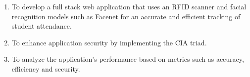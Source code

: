 \begin{comment}
How to formulate your research objectives:
1. Identify what research steps do you need to perform to achieve your general objective.
2. Identify the questions that must be answered for you to achieve your general objective.
    Thereafter, convert these questions into action statements

Example #1:

Research Question:
  What are the general features of a web-based learning environment?

Specific Objective:
   To review existing web-based learning environment that teaches language learning for children


Example #2:

Research Question:
   How will you represent commonsense knowledge for use by computer systems?

Specific Objective:
   To identify knowledge representation approaches used by existing story generation systems

Example #3:
Research Question:
   What types of storytelling knowledge are needed to generate stories?

Specific Objective:
    To identify the different types of storytelling knowledge used in generating stories

Example #4:
Research Question:
    What machine learning approaches will you utilize?

Specific Objective:
    To determine existing machine learning algorithms [that can be used in training the computer system to detect cyberbullying cases] 

Example #5: Research Question:
    How will your research output be evaluated?

Specific Objective:
    To define evaluation metrics for validating the accuracy of the translation

\end{comment}

%
%

\begin{enumerate}
   \item To develop a full stack web application that uses an RFID scanner and facial recognition models such as Facenet for an accurate and efficient tracking of student attendance.
   \item To enhance application security by implementing the CIA triad.
   \item To analyze the application's performance based on metrics such as accuracy, efficiency and security.
\end{enumerate}


